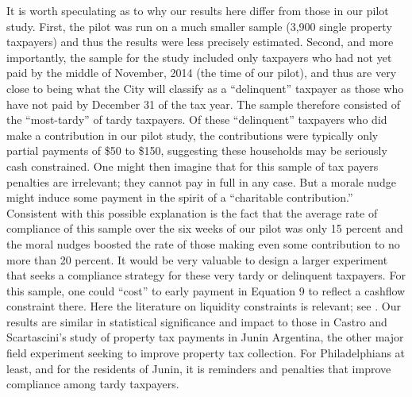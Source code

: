 \documentclass[12pt]{article}
\begin{document}
It is worth speculating as to why our results here differ from those
in our pilot study.  First, the pilot was run on a much smaller sample
(3,900 single property taxpayers) and thus the results were less
precisely estimated.  Second, and more importantly, the sample for the
study included only taxpayers who had not yet paid by the middle of
November, 2014 (the time of our pilot), and thus are very close to
being what the City will classify as a ``delinquent'' taxpayer as those
who have not paid by December 31 of the tax year.  The sample
therefore consisted of the ``most-tardy'' of tardy taxpayers.  Of
these ``delinquent'' taxpayers who did make a contribution in our pilot study, the contributions were typically only partial payments of
\$50 to \$150, suggesting these households may be seriously cash
constrained.  One might then imagine that for this sample of tax
payers penalties are irrelevant; they cannot pay in full in any case.
But a morale nudge might induce some payment in the spirit of a
``charitable contribution.''  Consistent with this possible explanation
is the fact that the average rate of compliance of this sample over
the six weeks of our pilot was only 15 percent and the moral nudges
boosted the rate of those making even some contribution to no more
than 20 percent.  It would be very valuable to design a larger
experiment that seeks a compliance strategy for these very tardy or
delinquent taxpayers. For this sample, one could ``cost'' to early payment in Equation 9 to reflect a cashflow constraint there. Here the literature on liquidity constraints is relevant; see . Our results are similar in statistical
significance and impact to those in Castro and Scartascini's
\citeyear{castro} study of property tax payments in Junin Argentina,
the other major field experiment seeking to improve property tax
collection.  For Philadelphians at least, and for the residents of
Junin, it is reminders and penalties that improve compliance among
tardy taxpayers.
\end{document}

